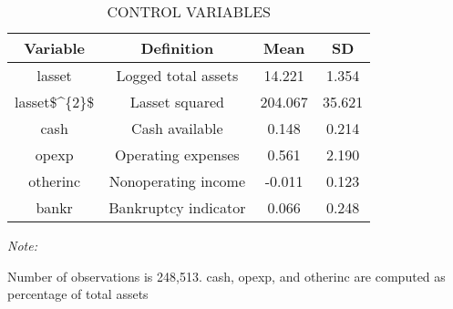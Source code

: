\begin{table}
\centering
\caption{CONTROL VARIABLES}
\centering
\begin{threeparttable}
\begin{tabular}[t]{cccc}
\toprule
Variable & Definition & Mean & SD\\
\midrule
lasset & Logged total assets & 14.221 & 1.354\\
lasset\$\textasciicircum{}\{2\}\$ & Lasset squared & 204.067 & 35.621\\
cash & Cash available & 0.148 & 0.214\\
opexp & Operating expenses & 0.561 & 2.190\\
otherinc & Nonoperating income & -0.011 & 0.123\\
\addlinespace
bankr & Bankruptcy indicator & 0.066 & 0.248\\
\bottomrule
\end{tabular}
\begin{tablenotes}
\item \textit{Note: } 
\item Number of observations is 248,513. cash, opexp, and otherinc are computed as percentage of total assets
\end{tablenotes}
\end{threeparttable}
\end{table}
